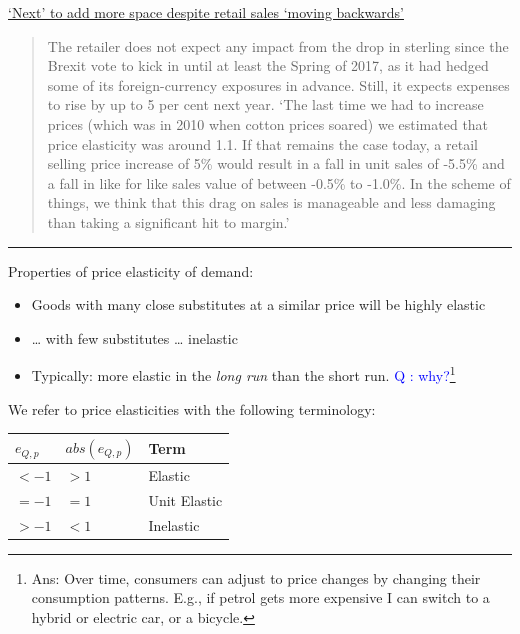 \documentclass[]{article}
\providecommand{\tightlist}{%
  \setlength{\itemsep}{0pt}\setlength{\parskip}{0pt}}
\begin{document}
\href{https://www.ft.com/content/932927d8-266c-3559-b87a-8d3efb07d5e1}{`Next'
to add more space despite retail sales `moving backwards'}

\begin{quote}
The retailer does not expect any impact from the drop in sterling since
the Brexit vote to kick in until at least the Spring of 2017, as it had
hedged some of its foreign-currency exposures in advance. Still, it
expects expenses to rise by up to 5 per cent next year. `The last time
we had to increase prices (which was in 2010 when cotton prices soared)
we estimated that price elasticity was around 1.1. If that remains the
case today, a retail selling price increase of 5\% would result in a
fall in unit sales of -5.5\% and a fall in like for like sales value of
between -0.5\% to -1.0\%. In the scheme of things, we think that this
drag on sales is manageable and less damaging than taking a significant
hit to margin.'
\end{quote}

\begin{center}\rule{0.5\linewidth}{\linethickness}\end{center}

Properties of price elasticity of demand:

\begin{itemize}
\tightlist
\item
  Goods with many close substitutes at a similar price will be highly
  elastic
\item
  \ldots{} with few substitutes \ldots{} inelastic
\item
  Typically: more elastic in the \emph{long run} than the short run.
  \textcolor{blue}{Q : why?}\footnote{Ans: Over time, consumers can
    adjust to price changes by changing their consumption patterns.
    E.g., if petrol gets more expensive I can switch to a hybrid or
    electric car, or a bicycle.}
\end{itemize}

\bigskip

We refer to price elasticities with the following terminology:

\begin{longtable}[]{@{}lll@{}}
\toprule
\(e_{Q,p}\) & \(abs(e_{Q,p})\) & Term\tabularnewline
\midrule
\endhead
\(< -1\) & \(>1\) & Elastic\tabularnewline
\(= -1\) & \(=1\) & Unit Elastic\tabularnewline
\(> -1\) & \(<1\) & Inelastic\tabularnewline
\bottomrule
\end{longtable}
\end{document}
